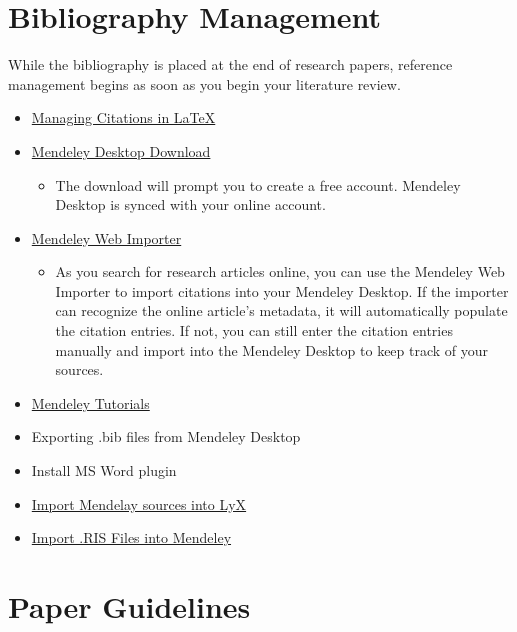 \documentclass[]{book}
\providecommand{\tightlist}{%
  \setlength{\itemsep}{0pt}\setlength{\parskip}{0pt}}
\begin{document}
\hypertarget{bibliography-management}{%
\chapter{Bibliography Management}\label{bibliography-management}}

While the bibliography is placed at the end of research papers, reference management begins as soon as you begin your literature review.

\begin{itemize}
\item
  \href{https://guides.library.yale.edu/bibtex/bibstyles}{Managing Citations in LaTeX}
\item
  \href{https://www.mendeley.com/download-desktop/}{Mendeley Desktop Download}

  \begin{itemize}
  \tightlist
  \item
    The download will prompt you to create a free account. Mendeley Desktop is synced with your online account.
  \end{itemize}
\item
  \href{https://www.mendeley.com/reference-management/web-importer\#id_2}{Mendeley Web Importer}

  \begin{itemize}
  \tightlist
  \item
    As you search for research articles online, you can use the Mendeley Web Importer to import citations into your Mendeley Desktop. If the importer can recognize the online article's metadata, it will automatically populate the citation entries. If not, you can still enter the citation entries manually and import into the Mendeley Desktop to keep track of your sources.
  \end{itemize}
\item
  \href{https://guides.library.yale.edu/mendeleybasics/mendeley/mendeley-desktop}{Mendeley Tutorials}
\item
  Exporting .bib files from Mendeley Desktop
\item
  Install MS Word plugin
\item
  \href{https://onhavingwords.wordpress.com/2013/03/19/mendeley-lyx/}{Import Mendelay sources into LyX}
\item
  \href{https://libguides.nus.edu.sg/c.php?g=145734\&p=1433095}{Import .RIS Files into Mendeley}
\end{itemize}

\hypertarget{paper-guidelines}{%
\chapter{Paper Guidelines}\label{paper-guidelines}}
\end{document}
